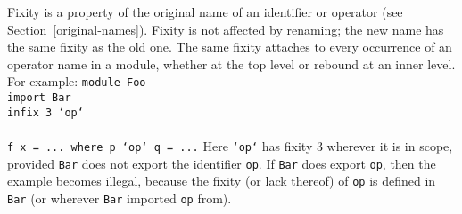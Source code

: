 Fixity is a property of the original name of an identifier or operator
(see Section~\ref{original-names}).  Fixity is not affected by
renaming; the new name has the same fixity as the old one.  The same
fixity attaches to every occurrence of an operator name in a module,
whether at the top level or rebound at an inner level.  For example:
\bprog
\mbox{\tt module\ Foo}\\
\mbox{\tt import\ Bar}\\
\mbox{\tt infix\ 3\ `op`}\\
\mbox{\tt }\\[-8pt]
\mbox{\tt f\ x\ =\ ...\ where\ p\ `op`\ q\ =\ ...}
\eprog
Here \mbox{\tt `op`} has fixity 3 wherever it is in scope, provided \mbox{\tt Bar} does not
export the identifier \mbox{\tt op}.  If \mbox{\tt Bar} does export \mbox{\tt op}, then the example
becomes illegal, because the fixity (or lack thereof) of \mbox{\tt op} is defined 
in \mbox{\tt Bar} (or wherever \mbox{\tt Bar} imported \mbox{\tt op} from).


